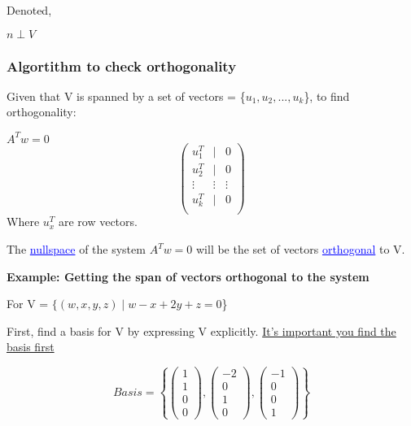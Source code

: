 \documentclass{article}
\newcommand{\bul}[1]{\textcolor{blue}{\underline{#1}}}
\newcommand{\sub}[1]{\vspace{10pt}\textbf{#1}}
\newcommand{\sbreak}{\vspace{10pt}}
\begin{document}
Denoted,
\begin{center}
    $n\perp V$
\end{center}

\subsubsection{Algortithm to check orthogonality}
Given that V is spanned by a set of vectors = \{$u_1, u_2, ..., u_k$\}, to find orthogonality:
\begin{center}
    $A^Tw = 0$
    \[
    \begin{pmatrix}
        u_1^T & \mid & 0 \\
        u_2^T & \mid & 0 \\
        \vdots & \vdots & \vdots \\
        u_k^T & \mid & 0 \\
    \end{pmatrix}
    \]
    Where $u_x^T$ are row vectors.
\end{center}
The \bul{nullspace} of the system $A^Tw=0$ will be the set of vectors \bul{orthogonal} to V.

\sub{Example: Getting the span of vectors orthogonal to the system}

For V = $\{(w,x,y,z)\mid w-x+2y+z=0$\}

\sbreak

First, find a basis for V by expressing V explicitly. \underline{It's important you find the basis first}

\begin{center}
     \[Basis =\left\{
        \begin{pmatrix}
            1 \\
            1\\
            0\\
            0
        \end{pmatrix},
        \begin{pmatrix}
            -2\\
            0\\
            1\\
            0
        \end{pmatrix},
        \begin{pmatrix}
            -1\\
            0\\
            0\\
            1
        \end{pmatrix}
    \right\}\]
\end{center}
\end{document}

